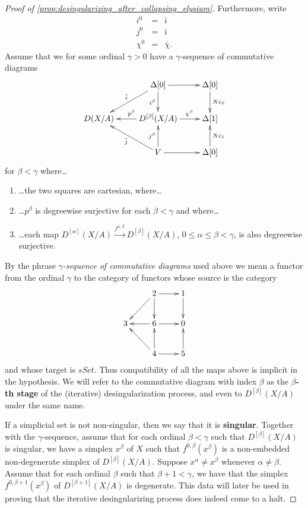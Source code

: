 \begin{proof}[Proof of \cref{prop:desingularizing_after_collapsing_elysium}]
Furthermore, write
\begin{displaymath}
\begin{array}{rcl}
i^0 & = & \bar{\imath } \\
j^0 & = & \bar{\imath } \\
\chi ^0 & = & \bar{\chi } .
\end{array}
\end{displaymath}
Assume that we for some ordinal $\gamma >0$ have a $\gamma$-sequence of commutative diagrams
\begin{displaymath}
\xymatrix{
& \Delta [0] \ar[ld]_{\tilde{i} } \ar[d]_{i^\beta } \ar[r] & \Delta [0] \ar[d]^{N\varepsilon _0} \\
D(X/A) & D^{[\beta ]}(X/A) \ar[l]_(.45){p^\beta } \ar[r]^(.6){\chi ^\beta } & \Delta [1] \\
& V \ar[lu]^{\tilde{j} } \ar[u]^{j^\beta } \ar[r] & \Delta [0] \ar[u]_{N\varepsilon _1}
}
\end{displaymath}
for $\beta <\gamma$ where\dots
\begin{enumerate}
\item{\dots the two squares are cartesian, where\dots}
\item{\dots $p^\beta$ is degreewise surjective for each $\beta <\gamma$ and where\dots}
\item{\dots each map $D^{[\alpha ]}(X/A)\xrightarrow{f^{\alpha ,\beta }} D^{[\beta ]}(X/A)$, $0\leq \alpha \leq \beta <\gamma$, is also degreewise surjective.}
\end{enumerate}
By the phrase \emph{$\gamma$-sequence of commutative diagrams} used above we mean a functor from the ordinal $\gamma$ to the category of functors whose source is the category
\begin{displaymath}
\xymatrix{
& 2 \ar[ld] \ar[d] \ar[r] & 1 \ar[d] \\
3 & 6 \ar[l] \ar[r] & 0 \\
& 4 \ar[lu] \ar[u] \ar[r] & 5 \ar[u]
}
\end{displaymath}
and whose target is $sSet$. Thus compatibility of all the maps above is implicit in the hypothesis. We will refer to the commutative diagram with index $\beta$ as the \textbf{$\beta$-th stage} of the (iterative) desingularization process, and even to $D^{[\beta ]}(X/A)$ under the same name.

If a simplicial set is not non-singular, then we say that it is \textbf{singular}. Together with the $\gamma$-sequence, assume that for each ordinal $\beta <\gamma$ such that $D^{[\beta ]}(X/A)$ is singular, we have a simplex $x^\beta$ of $X$ such that $f^{0,\beta }(x^\beta )$ is a non-embedded non-degenerate simplex of $D^{[\beta ]}(X/A)$. Suppose $x^\alpha \neq x^\beta$ whenever $\alpha \neq \beta$. Assume that for each ordinal $\beta$ such that $\beta +1<\gamma$, we have that the simplex $f^{0,\beta +1}(x^\beta )$ of $D^{[\beta +1]}(X/A)$ is degenerate. This data will later be used in proving that the iterative desingularizing process does indeed come to a halt.


\end{proof}
